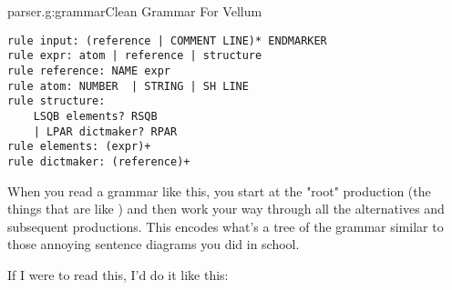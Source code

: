 \begin{code}{parser.g:grammar}{Clean Grammar For Vellum}
\begin{Verbatim}[commandchars=@\[\]]
rule input: (reference | COMMENT LINE)* ENDMARKER 
rule expr: atom | reference | structure 
rule reference: NAME expr 
rule atom: NUMBER  | STRING | SH LINE 
rule structure: 
    LSQB elements? RSQB 
    | LPAR dictmaker? RPAR 
rule elements: (expr)+ 
rule dictmaker: (reference)+
\end{Verbatim}

\end{code}

When you read a grammar like this, you start at the "root" production (the
things that are like ) and then work your way
through all the alternatives and subsequent productions.  This encodes
what's a tree of the grammar similar to those annoying sentence diagrams
you did in school.

If I were to read this, I'd do it like this:

